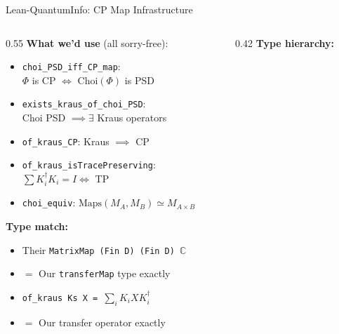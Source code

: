 \documentclass[aspectratio=169,10pt]{beamer}
\begin{document}
\begin{frame}{Lean-QuantumInfo: CP Map Infrastructure}

\begin{columns}[T]
\begin{column}{0.55\textwidth}
\textbf{What we'd use} (all sorry-free):
\begin{itemize}\small\itemsep1pt
  \item \texttt{choi\_PSD\_iff\_CP\_map}:\\ $\Phi$ is CP $\iff$ Choi$(\Phi)$ is PSD
  \item \texttt{exists\_kraus\_of\_choi\_PSD}:\\ Choi PSD $\implies \exists$ Kraus operators
  \item \texttt{of\_kraus\_CP}: Kraus $\implies$ CP
  \item \texttt{of\_kraus\_isTracePreserving}:\\ $\sum K_i^\dagger K_i = I \iff$ TP
  \item \texttt{choi\_equiv}:
    $\mathrm{Maps}(M_A, M_B) \simeq M_{A \times B}$
\end{itemize}

\vspace{0.2em}
\textbf{Type match:}
\begin{itemize}\small\itemsep1pt
  \item Their \texttt{MatrixMap (Fin D) (Fin D) $\mathbb{C}$}
  \item $=$ Our \texttt{transferMap} type exactly
  \item \texttt{of\_kraus Ks X = $\sum_i K_i X K_i^\dagger$}
  \item $=$ Our transfer operator exactly
\end{itemize}
\end{column}
\begin{column}{0.42\textwidth}
\textbf{Type hierarchy:}


\end{column}
\end{columns}
\end{frame}
\end{document}
